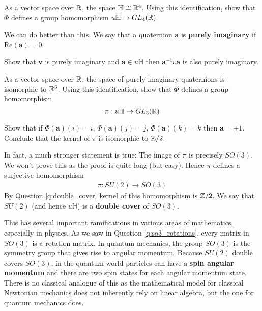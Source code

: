 \begin{question}
	As a vector space over $\mathbb{R}$, the space $\mathbb{H} \cong \mathbb{R}^4$. Using this identification, show that $\Phi$ defines a group homomorphism $u \mathbb{H} \rightarrow GL_4(\mathbb{R})$.
\end{question}
\newpage
We can do better than this. We say that a quaternion $\mathbf{a}$ is \textbf{purely imaginary} if $\mathrm{Re}(\mathbf{a}) = 0$.

\begin{question}
	Show that $\mathbf{v}$ is purely imaginary and $\mathbf{a} \in u \mathbb{H}$ then $\mathbf{a}^{-1} v \mathbf{a}$ is also purely imaginary.
\end{question}

\begin{question}
	As a vector space over $\mathbb{R}$, the space of purely imaginary quaternions is isomorphic to $\mathbb{R}^3$. Using this identification, show that $\Phi$ defines a group homomorphism $$\pi: u \mathbb{H} \rightarrow GL_3(\mathbb{R})$$
\end{question}

\begin{question}
	\label{q:double_cover}
	Show that if $\Phi(\mathbf{a})(i) = i$, $\Phi(\mathbf{a})(j) = j$, $\Phi(\mathbf{a})(k) = k$ then $\mathbf{a} = \pm 1$. Conclude that the kernel of $\pi$ is isomorphic to $\mathbb{Z}/2$.
\end{question}

In fact, a much stronger statement is true: The image of $\pi$ is precisely $SO(3)$. We won't prove this as the proof is quite long (but easy). Hence $\pi$ defines a surjective homomorphism
\begin{align*}
	\pi : SU(2) \rightarrow SO(3)
\end{align*}
By Question \ref{q:double_cover} kernel of this homomorphism is $\mathbb{Z}/2$. We say that $SU(2)$ (and hence $u \mathbb{H}$) is a \textbf{double cover} of $SO(3)$.

This has several important ramifications in various areas of mathematics, especially in physics. As we saw in Question \ref{q:so3_rotations}, every matrix in $SO(3)$ is a rotation matrix. In quantum mechanics, the group $SO(3)$ is the symmetry group that gives rise to angular momentum. Because $SU(2)$ double covers $SO(3)$, in the quantum world particles can have a \textbf{spin angular momentum} and there are two spin states for each angular momentum state. There is no classical analogue of this as the mathematical model for classical Newtonian mechanics does not inherently rely on linear algebra, but the one for quantum mechanics does.

